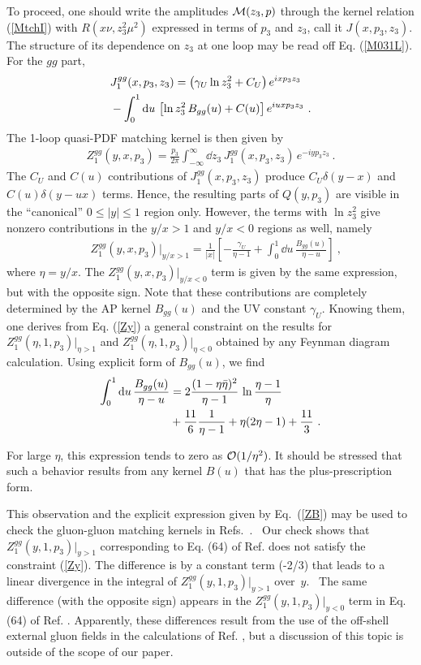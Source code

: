 To proceed, one should write the amplitudes ${\cal M} (z_3, p)$ through the kernel
relation (\ref{MtchI}) with $R(x \nu, z_3^2 \mu^2 )$ expressed in terms of $p_3$ and $z_3$,
call it $J(x, p_3, z_3)$.
The structure of its dependence on $z_3$ at one loop may be read off Eq. (\ref{M031L}).
For the $gg$ part,
\begin{align}
& J_1^{gg} (x, p_3, z_3)= \left (\gamma_U \ln z_3^2 +C_U \right) e^{ix p_3 z_3}
\nonumber \\  & - \int_0^1 \mathrm{d} u \,\left [ \ln z_3^2 \, B_{gg} (u)
+C (u) \right ]e^{iu x p_3 z_3} \ .
\label{Jk}
\end{align}
The 1-loop quasi-PDF matching kernel is then given by
\begin{align}
Z_1^{gg} (y, x, p_3) = \frac{p_3}{2 \pi}
\int_{-\infty}^\infty \dd z_3 \, J_1^{gg} (x, p_3, z_3)
\, e^{-i y p_3 z_3} \
.
\label{qZ}
\end{align}
The $C_U$ and $C(u)$ contributions of $J_1^{gg} (x, p_3, z_3)$
produce \mbox{$C_U \delta (y- x)$} and $C (u)\delta (y - u x )$ terms.
Hence,
the resulting parts of $Q(y,p_3)$ are visible
in the ``canonical'' $0\leq |y| \leq 1$ region only. However, the terms
with $\ln z_3^2$ give nonzero contributions in the $y/x>1$
and $y/x<0$ regions
as well, namely
\begin{align}
& \, Z_1^{gg} (y, x, p_3) |_{y/x>1} = \frac1{|x|} \left [- \frac{\gamma_U}{\eta -1}
+ \int_0^1 \dd u \, \frac{B_{gg} (u)}{\eta-u} \right ]
\ ,
\label{Zy}
\end{align}
where $\eta= y/x$.
The $Z_1^{gg} (y, x, p_3) |_{y/x<0}$ term is given by the same expression, but with the opposite sign.
Note that these contributions are completely
determined by the AP kernel $B_{gg} (u)$ and the UV constant
$\gamma_U$.
Knowing them, one derives from Eq. (\ref{Zy}) a general constraint on the results
for $Z_1^{gg} (\eta, 1, p_3) |_{\eta>1}$
and $Z_1^{gg} (\eta, 1, p_3) |_{\eta<0}$
obtained by any Feynman diagram calculation.
Using explicit form of $B_{gg} (u)$, we find
\begin{align}
\int_0^1 \mathrm{d} u \, \frac{B_{gg} (u) }{\eta-u} & = 2 \frac{(1-\eta \bar \eta)^2}{\eta -1} \, \ln \frac{\eta-1}{\eta}
\nonumber \\  & + \frac{11}{6} \frac{1}{\eta -1} + \eta (2 \eta -1) +\frac{11}{3}
\ .
\label{ZB}
\end{align}

For large $\eta$, this expression tends to zero as ${\cal O}(1/\eta^2)$.
It should be stressed that such a behavior results from any kernel $B(u)$ that has the plus-prescription form.

This observation and the explicit expression given by \mbox{Eq. (\ref{ZB})}
may be used to check the gluon-gluon matching kernels
in \mbox{Refs. \cite{Wang:2017qyg,Wang:2019tgg}. }
Our check shows that $Z_1^{gg} (y, 1, p_3) |_{y>1}$ corresponding to Eq. (64) of Ref.
\cite{Wang:2019tgg} does not satisfy the constraint (\ref{Zy}).
The difference is by a constant term (-2/3) that leads to a linear divergence
in the integral of $Z_1^{gg} (y, 1, p_3) |_{y>1}$ \mbox{over $y$. }
The same difference (with the opposite sign) appears
in the $Z_1^{gg} (y, 1, p_3) |_{y<0}$ term in Eq. (64) of Ref. \cite{Wang:2019tgg}.
Apparently, these differences result from the use of
the off-shell external gluon fields in the calculations of Ref. \cite{Wang:2019tgg},
but a discussion of this topic is outside of the scope of our paper.

